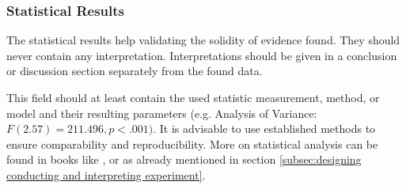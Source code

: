 
\subsubsection{Statistical Results}
\label{statisticalresults}

The statistical results help validating the solidity of evidence found. They should never contain any interpretation. Interpretations should be given in a conclusion or discussion section separately from the found data.

This field should at least contain the used statistic measurement, method, or model and their resulting parameters (e.g. Analysis of Variance: $F(2.57)=211.496, p<.001)$. It is advisable to use established methods to ensure comparability and reproducibility. More on statistical analysis can be found in books like \cite{Wohlin2012}, or \cite{Albert2008} as already mentioned in section \ref{subsec:designing conducting and interpreting experiment}.
